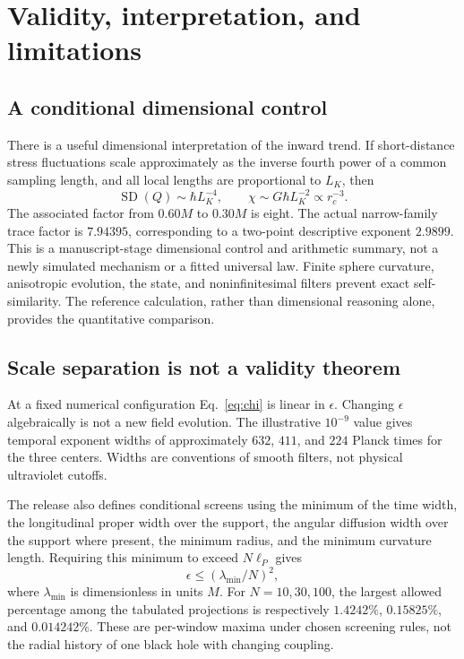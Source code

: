 \documentclass[aps,prd,reprint,floatfix,nofootinbib,longbibliography]{revtex4-2}
\newcommand{\ee}{\epsilon}
\newcommand{\RMS}{\operatorname{SD}}
\newcommand{\Lc}{L_{\!K}}
\begin{document}
\section{Validity, interpretation, and limitations}
\subsection{A conditional dimensional control}
There is a useful dimensional interpretation of the inward trend. If short-distance stress fluctuations scale approximately as the inverse fourth power of a common sampling length, and all local lengths are proportional to $\Lc$, then
\begin{equation}
 \RMS(Q)\sim\hbar\Lc^{-4},\qquad
 \chi\sim G\hbar\Lc^{-2}\propto r_c^{-3}.
 \label{eq:dimensional}
\end{equation}
The associated factor from $0.60M$ to $0.30M$ is eight. The actual narrow-family trace factor is $7.94395$, corresponding to a two-point descriptive exponent $2.9899$. This is a manuscript-stage dimensional control and arithmetic summary, not a newly simulated mechanism or a fitted universal law. Finite sphere curvature, anisotropic evolution, the state, and noninfinitesimal filters prevent exact self-similarity. The reference calculation, rather than dimensional reasoning alone, provides the quantitative comparison.

\subsection{Scale separation is not a validity theorem}
At a fixed numerical configuration Eq.~\eqref{eq:chi} is linear in $\ee$. Changing $\ee$ algebraically is not a new field evolution. The illustrative $10^{-9}$ value gives temporal exponent widths of approximately $632$, $411$, and $224$ Planck times for the three centers. Widths are conventions of smooth filters, not physical ultraviolet cutoffs.

The release also defines conditional screens using the minimum of the time width, the longitudinal proper width over the support, the angular diffusion width over the support where present, the minimum radius, and the minimum curvature length. Requiring this minimum to exceed $N\ell_P$ gives
\begin{equation}
 \ee\leq(\lambda_{\min}/N)^2,
 \label{eq:screen}
\end{equation}
where $\lambda_{\min}$ is dimensionless in units $M$. For $N=10,30,100$, the largest allowed percentage among the tabulated projections is respectively $1.4242\%$, $0.15825\%$, and $0.014242\%$. These are per-window maxima under chosen screening rules, not the radial history of one black hole with changing coupling.
\end{document}
